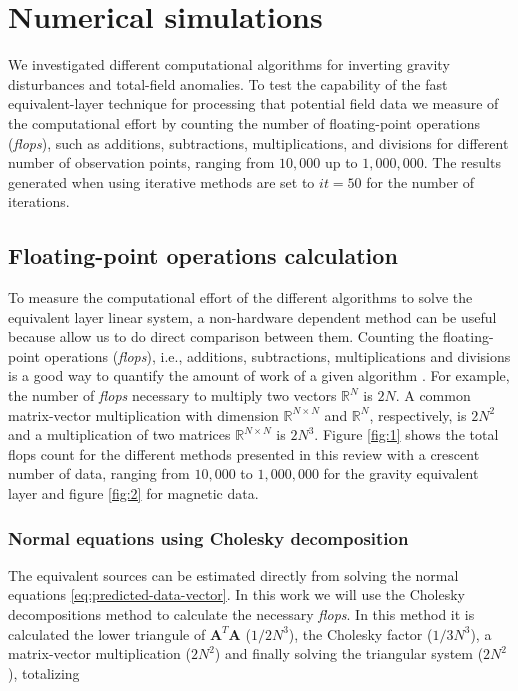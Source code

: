 \section{Numerical simulations}
\label{sec:num_simulations}

We investigated different computational algorithms for inverting gravity disturbances and total-field anomalies. To test the capability of the fast equivalent-layer technique for processing that potential field data we measure of the computational effort by counting the number of floating-point operations (\textit{flops}), such as additions, subtractions, multiplications, and divisions \citep{golub-vanloan2013} for different number of observation points, ranging from $10,000$ up to $1, 000, 000$. The results generated when using iterative methods are set to $\textit{it} = 50$ for the number of iterations.
 
\subsection{Floating-point operations calculation}

To measure the computational effort of the different algorithms to solve the equivalent layer linear system, a non-hardware dependent method can be useful because allow us to do direct comparison between them. Counting the floating-point operations (\textit{flops}), i.e., additions, subtractions, multiplications and divisions is a good way to quantify the amount of work of a given algorithm \citep{golub-vanloan2013}. For example, the number of \textit{flops} necessary to multiply two vectors $\mathbb{R}^{N}$ is $2N$. A common matrix-vector multiplication with dimension $\mathbb{R}^{N \times N}$ and $\mathbb{R}^{N}$, respectively, is $2N^2$ and a multiplication of two matrices $\mathbb{R}^{N \times N}$ is $2N^3$. Figure \ref{fig:1} shows the total flops count for the different methods presented in this review with a crescent number of data, ranging from $10,000$ to $1,000,000$ for the gravity equivalent layer and figure \ref{fig:2} for magnetic data. 

\subsubsection{Normal equations using Cholesky decomposition}

The equivalent sources can be estimated directly from solving the normal equations \ref{eq:predicted-data-vector}. In this work we will use the Cholesky decompositions method to calculate the necessary \textit{flops}. In this method it is calculated the lower triangule of $\mathbf{A}^T\mathbf{A}$ ($1/2 N^3$), the Cholesky factor ($1/3 N^3$), a matrix-vector multiplication ($2N^2$) and finally solving the triangular system ($2N^2$), totalizing

